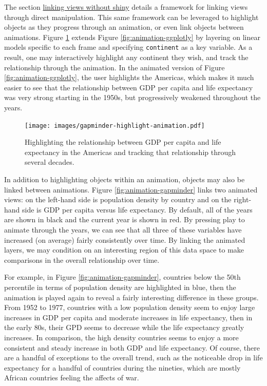 \documentclass[12pt,]{isuthesis}
\begin{document}
The section \protect\hyperlink{linking-views-without-shiny}{linking
views without shiny} details a framework for linking views through
direct manipulation. This same framework can be leveraged to highlight
objects as they progress through an animation, or even link objects
between animations. Figure \ref{fig:gapminder-highlight-animation}
extends Figure \ref{fig:animation-ggplotly} by layering on linear models
specific to each frame and specifying \texttt{continent} as a key
variable. As a result, one may interactively highlight any continent
they wish, and track the relationship through the animation. In the
animated version of Figure \ref{fig:animation-ggplotly}, the user
highlights the Americas, which makes it much easier to see that the
relationship between GDP per capita and life expectancy was very strong
starting in the 1950s, but progressively weakened throughout the years.

\begin{figure}
\centering
\texttt{[image: images/gapminder-highlight-animation.pdf]}
\caption{\label{fig:gapminder-highlight-animation}Highlighting the
relationship between GDP per capita and life expectancy in the Americas
and tracking that relationship through several decades.}
\end{figure}

In addition to highlighting objects within an animation, objects may
also be linked between animations. Figure \ref{fig:animation-gapminder}
links two animated views: on the left-hand side is population density by
country and on the right-hand side is GDP per capita versus life
expectancy. By default, all of the years are shown in black and the
current year is shown in red. By pressing play to animate through the
years, we can see that all three of these variables have increased (on
average) fairly consistently over time. By linking the animated layers,
we may condition on an interesting region of this data space to make
comparisons in the overall relationship over time.

For example, in Figure \ref{fig:animation-gapminder}, countries below
the 50th percentile in terms of population density are highlighted in
blue, then the animation is played again to reveal a fairly interesting
difference in these groups. From 1952 to 1977, countries with a low
population density seem to enjoy large increases in GDP per capita and
moderate increases in life expectancy, then in the early 80s, their GPD
seems to decrease while the life expectancy greatly increases. In
comparison, the high density countries seems to enjoy a more consistent
and steady increase in both GDP and life expectancy. Of course, there
are a handful of exceptions to the overall trend, such as the noticeable
drop in life expectancy for a handful of countries during the nineties,
which are mostly African countries feeling the affects of war.
\end{document}
